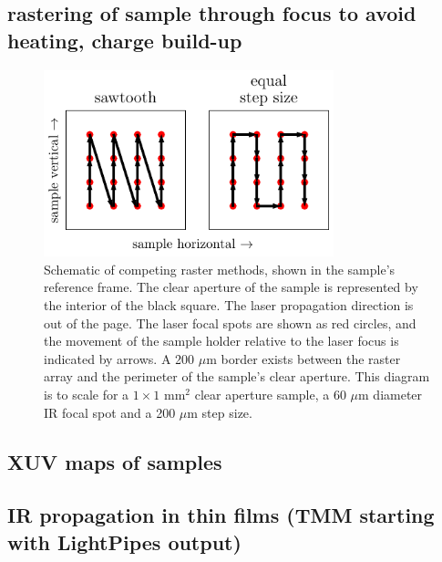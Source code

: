 \subsection{rastering of sample through focus to avoid heating, charge build-up}

\begin{figure}
	\centering
	\includegraphics[width=0.75\textwidth]{figures/chap4/rastering_methods.pdf}
	\caption{Schematic of competing raster methods, shown in the sample's reference frame. The clear aperture of the sample is represented by the interior of the black square. The laser propagation direction is out of the page. The laser focal spots are shown as red circles, and the movement of the sample holder relative to the laser focus is indicated by arrows. A 200 $\mu$m border exists between the raster array and the perimeter of the sample's clear aperture. This diagram is to scale for a $1\times1$ mm$^2$ clear aperture sample, a 60 $\mu$m diameter IR focal spot and a 200 $\mu$m step size.}
	\label{fig:Rastering_Methods}
\end{figure}

\subsection{XUV maps of samples}

\subsection{IR propagation in thin films (TMM starting with LightPipes output)}

